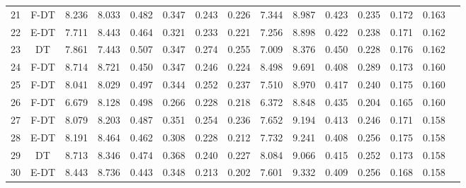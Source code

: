 \begin{longtable}{@{\hskip3pt}c@{\hskip3pt}c@{\hskip3pt}c@{\hskip3pt}c@{\hskip3pt}c@{\hskip3pt}c@{\hskip3pt}c@{\hskip3pt}c@{\hskip3pt}c@{\hskip3pt}c@{\hskip3pt}c@{\hskip3pt}c@{\hskip3pt}c@{\hskip3pt}c@{\hskip3pt}c}
         21 &           F-DT &             8.236 &       8.033 &         0.482 &       0.347 &       0.243 &        0.226 &               7.344 &       8.987 &         0.423 &       0.235 &       0.172 &        0.163 \\
         22 &           E-DT &             7.711 &       8.443 &         0.464 &       0.321 &       0.233 &        0.221 &               7.256 &       8.898 &         0.422 &       0.238 &       0.171 &        0.162 \\
         23 &             DT &             7.861 &       7.443 &         0.507 &       0.347 &       0.274 &        0.255 &               7.009 &       8.376 &         0.450 &       0.228 &       0.176 &        0.162 \\
         24 &           F-DT &             8.714 &       8.721 &         0.450 &       0.347 &       0.246 &        0.224 &               8.498 &       9.691 &         0.408 &       0.289 &       0.173 &        0.160 \\
         25 &           F-DT &             8.041 &       8.029 &         0.497 &       0.344 &       0.252 &        0.237 &               7.510 &       8.970 &         0.417 &       0.240 &       0.175 &        0.160 \\
         26 &           F-DT &             6.679 &       8.128 &         0.498 &       0.266 &       0.228 &        0.218 &               6.372 &       8.848 &         0.435 &       0.204 &       0.165 &        0.160 \\
         27 &           F-DT &             8.079 &       8.203 &         0.487 &       0.351 &       0.254 &        0.236 &               7.652 &       9.194 &         0.413 &       0.246 &       0.171 &        0.158 \\
         28 &           E-DT &             8.191 &       8.464 &         0.462 &       0.308 &       0.228 &        0.212 &               7.732 &       9.241 &         0.408 &       0.256 &       0.175 &        0.158 \\
         29 &             DT &             8.713 &       8.346 &         0.474 &       0.368 &       0.240 &        0.227 &               8.084 &       9.066 &         0.415 &       0.252 &       0.173 &        0.158 \\
         30 &           E-DT &             8.443 &       8.736 &         0.443 &       0.348 &       0.213 &        0.202 &               7.601 &       9.332 &         0.409 &       0.256 &       0.168 &        0.158 \\

\end{longtable}
